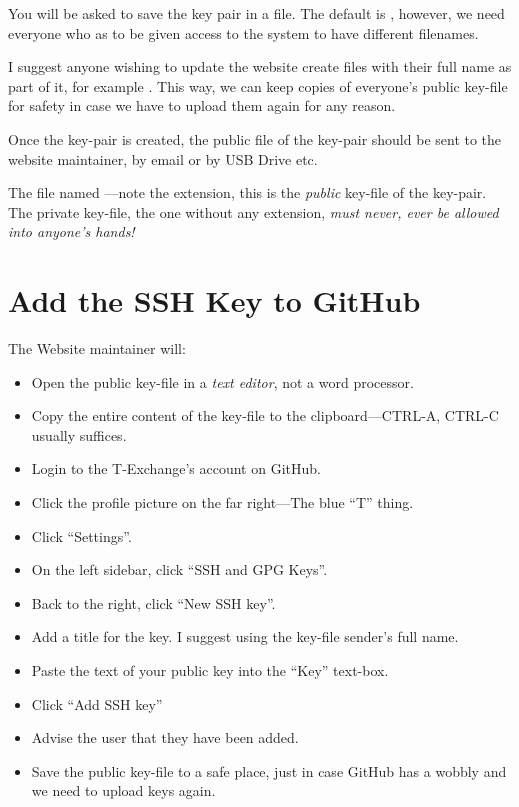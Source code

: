 You will be asked to save the key pair in a file. The default is , however, we need everyone who as to be given access to the system to have different filenames.

I suggest anyone wishing to update the website create files with their full name as part of it, for example . This way, we can keep copies of everyone's public key-file for safety in case we have to upload them again for any reason.

Once the key-pair is created, the public file of the key-pair should be sent to the website maintainer, by email or by USB Drive etc.

The file named ---note the  extension, this is the \emph{public} key-file of the key-pair. The private key-file, the one without any extension, \emph{must never, ever be allowed into anyone's hands!}

\section{Add the SSH Key to GitHub}

The Website maintainer will:

\begin{itemize}
    \item Open the public key-file in a \emph{text editor}, not a word processor.
    \item Copy the entire content of the key-file to the clipboard---CTRL-A, CTRL-C usually suffices.
    \item Login to the T-Exchange's account on GitHub.
    \item Click the profile picture on the far right---The blue ``T'' thing.
    \item Click ``Settings''.
    \item On the left sidebar, click ``SSH and GPG Keys''.
    \item Back to the right, click ``New SSH key''.
    \item Add a title for the key. I suggest using the key-file sender's full name.
    \item Paste the text of your public key into the ``Key'' text-box.
    \item Click ``Add SSH key''
    \item Advise the user that they have been added.
    \item Save the public key-file to a safe place, just in case GitHub has a wobbly and we need to upload keys again.
\end{itemize}

